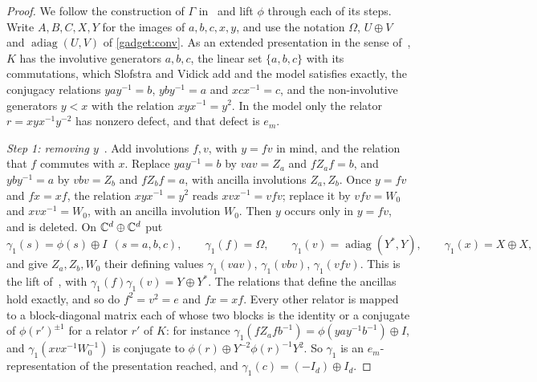 \begin{proof}
We follow the construction of $\Gamma$ in~\cite[proof of Proposition~6.2]{SV18} and lift $\phi$ through each of its steps. Write
$A,B,C,X,Y$ for the images of $a,b,c,x,y$, and use the notation $\Omega$, $U\oplus V$ and $\operatorname{adiag}(U,V)$ of
\cref{gadget:conv}. As an extended presentation in the sense of~\cite[\S6]{SV18}, $K$ has the involutive generators $a,b,c$, the linear
set $\{a,b,c\}$ with its commutations, which Slofstra and Vidick add and the model satisfies exactly, the conjugacy relations $yay^{-1}=b$,
$yby^{-1}=a$ and $xcx^{-1}=c$, and the non-involutive generators $y<x$ with the relation $xyx^{-1}=y^2$. In the model only the relator
$r=xyx^{-1}y^{-2}$ has nonzero defect, and that defect is $e_m$.

\emph{Step 1: removing $y$}~\cite[Proposition~4.8]{Slo19}. Add involutions $f,v$, with $y=fv$ in mind, and the relation that $f$ commutes
with $x$. Replace $yay^{-1}=b$ by $vav=Z_a$ and $fZ_af=b$, and $yby^{-1}=a$ by $vbv=Z_b$ and $fZ_bf=a$, with ancilla involutions
$Z_a,Z_b$. Once $y=fv$ and $fx=xf$, the relation $xyx^{-1}=y^2$ reads $xvx^{-1}=vfv$; replace it by $vfv=W_0$ and $xvx^{-1}=W_0$, with an
ancilla involution $W_0$. Then $y$ occurs only in $y=fv$, and is deleted. On $\mathbb C^d\oplus\mathbb C^d$ put
\[
\gamma_1(s)=\phi(s)\oplus I\ \ (s=a,b,c),\qquad\gamma_1(f)=\Omega,\qquad\gamma_1(v)=\operatorname{adiag}(Y^*,Y),\qquad\gamma_1(x)=X\oplus X,
\]
and give $Z_a,Z_b,W_0$ their defining values $\gamma_1(vav)$, $\gamma_1(vbv)$, $\gamma_1(vfv)$. This is the lift
of~\cite[Proposition~4.8]{Slo19}, with $\gamma_1(f)\gamma_1(v)=Y\oplus Y^*$. The relations that define the ancillas hold exactly,
and so do $f^2=v^2=e$ and $fx=xf$. Every other relator is mapped to a block-diagonal matrix each of whose two blocks is the identity or a conjugate
of $\phi(r')^{\pm1}$ for a relator $r'$ of $K$: for instance
$\gamma_1(fZ_afb^{-1})=\phi(yay^{-1}b^{-1})\oplus I$, and $\gamma_1(xvx^{-1}W_0^{-1})$ is conjugate to $\phi(r)\oplus Y^{-2}\phi(r)^{-1}Y^2$. So
$\gamma_1$ is an $e_m$-representation of the presentation reached, and $\gamma_1(c)=(-I_d)\oplus I_d$.


\end{proof}
